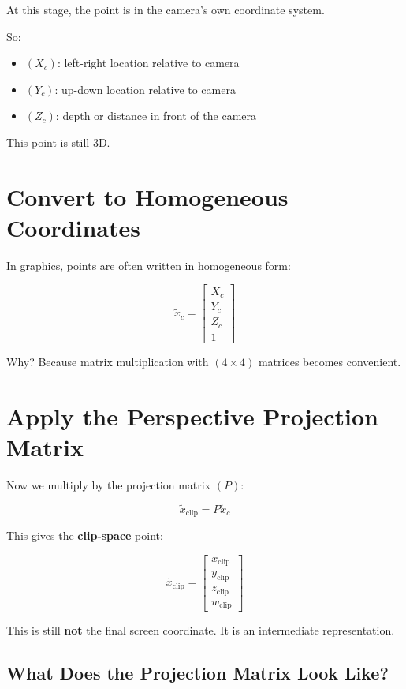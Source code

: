 \documentclass[11pt,letterpaper]{article}
\begin{document}
At this stage, the point is in the camera's own coordinate system.

So:

\begin{itemize}
\item $(X_c)$: left-right location relative to camera
\item $(Y_c)$: up-down location relative to camera
\item $(Z_c)$: depth or distance in front of the camera
\end{itemize}

This point is still 3D.

\section{Convert to Homogeneous Coordinates}

In graphics, points are often written in homogeneous form:

\[
\tilde{x}_c =
\begin{bmatrix}
X_c\\
Y_c\\
Z_c\\
1
\end{bmatrix}
\]

Why? Because matrix multiplication with $(4 \times 4)$ matrices becomes convenient.

\section{Apply the Perspective Projection Matrix}

Now we multiply by the projection matrix $(P)$:

\[
\tilde{x}_{\text{clip}} = P \tilde{x}_c
\]

This gives the \textbf{clip-space} point:

\[
\tilde{x}_{\text{clip}} =
\begin{bmatrix}
x_{\text{clip}}\\
y_{\text{clip}}\\
z_{\text{clip}}\\
w_{\text{clip}}
\end{bmatrix}
\]

This is still \textbf{not} the final screen coordinate. It is an intermediate representation.

\subsection{What Does the Projection Matrix Look Like?}
\end{document}
